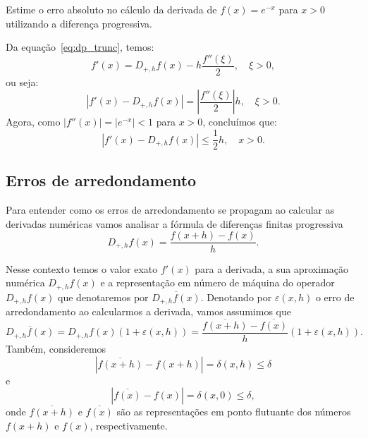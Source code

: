 \begin{ex}
Estime o erro absoluto no cálculo da derivada de $f(x)=e^{-x}$ para $x>0$ utilizando a diferença progressiva.
\end{ex}
\begin{sol}
Da equação~\ref{eq:dp_trunc}, temos:
\begin{equation*}
  f'(x) = D_{+,h}f(x) - h\frac{f''(\xi)}{2},\quad \xi>0,
\end{equation*}
ou seja:
\begin{equation*}
  |f'(x) - D_{+,h}f(x)| = \left|\frac{f''(\xi)}{2}\right|h,\quad \xi>0.
\end{equation*}
Agora, como $|f''(x)| = |e^{-x}| < 1$ para $x>0$, concluímos que:
\begin{equation*}
  |f'(x) - D_{+,h}f(x)| \leq \frac{1}{2}h,\quad x>0.
\end{equation*}
\end{sol}

\subsection{Erros de arredondamento}
Para entender como os erros de arredondamento se propagam ao calcular as derivadas numéricas vamos analisar a fórmula de diferenças finitas progressiva
\begin{equation*}
  D_{+,h}f(x) =\frac{f(x+h)-f(x)}{h}.  
\end{equation*}

Nesse contexto temos o valor exato $f'(x)$ para a derivada, a sua aproximação numérica $D_{+,h}f(x)$ e a representação em número de máquina do operador $D_{+,h}f(x)$ que denotaremos por $\overline{D_{+,h}f(x)}$. Denotando por $\varepsilon(x,h)$ o erro de arredondamento ao calcularmos a derivada, vamos assumimos que
\begin{equation}\label{ex:ea_dp}
\overline{D_{+,h}f(x)}=D_{+,h}f(x)(1+\varepsilon(x,h))=\frac{\overline{f(x+h)}-\overline{f(x)}}{h}(1+\varepsilon(x,h)).  
\end{equation}
Também, consideremos
\begin{equation*}
|\overline{f(x+h)}-f(x+h)|=\delta(x,h)\leq \delta  
\end{equation*}
e
\begin{equation*}
  |\overline{f(x)}-f(x)|=\delta(x,0)\leq \delta,  
\end{equation*}
onde $\overline{f(x+h)}$ e $\overline{f(x)}$ são as representações em ponto flutuante dos números $f(x+h)$ e $f(x)$, respectivamente. 

